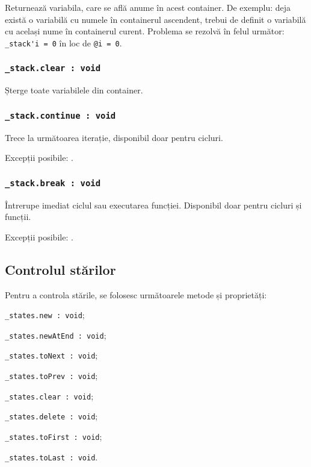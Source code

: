 Returnează variabila, care se află anume în acest container. De exemplu: deja există o variabilă cu numele  în containerul ascendent, trebui de definit o variabilă cu același nume în containerul curent. Problema se rezolvă în felul următor: \lstinline|_stack'i = 0| în loc de \lstinline|@i = 0|.

\subsubsection{\lstinline|_stack.clear : void|}

Șterge toate variabilele din container.

\subsubsection{\lstinline|_stack.continue : void|}

Trece la următoarea iterație, disponibil doar pentru cicluri.

Excepții posibile: .

\subsubsection{\lstinline|_stack.break : void|}

Întrerupe imediat ciclul sau executarea funcției. Disponibil doar pentru cicluri și funcții.

Excepții posibile: .

\subsection{Controlul stărilor}

Pentru a controla stările, se folosesc următoarele metode și proprietăți:
\begin{icItems}
	\item \lstinline|_states.new : void|;
	\item \lstinline|_states.newAtEnd : void|;
	\item \lstinline|_states.toNext : void|;
	\item \lstinline|_states.toPrev : void|;
	\item \lstinline|_states.clear : void|;
	\item \lstinline|_states.delete : void|;
	\item \lstinline|_states.toFirst : void|;
	\item \lstinline|_states.toLast : void|.
\end{icItems}

